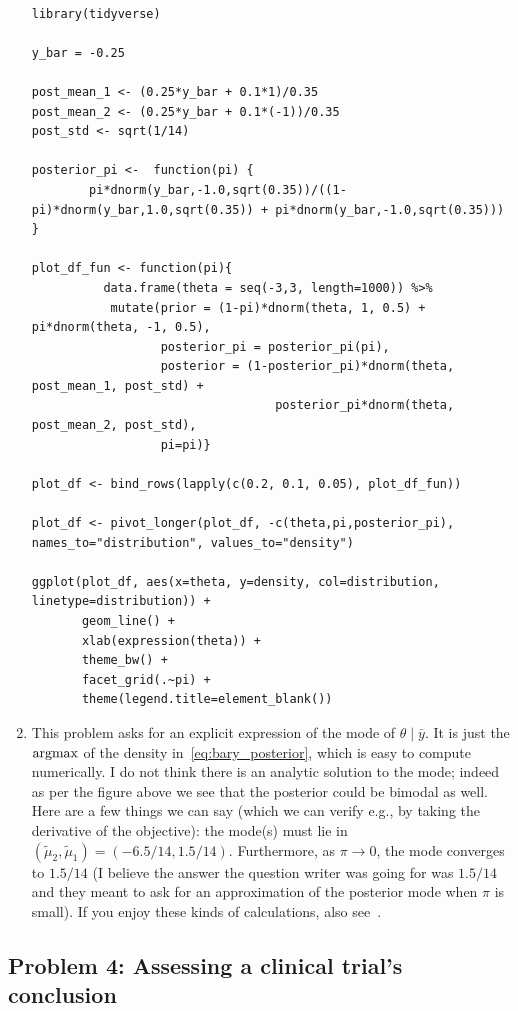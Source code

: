 \begin{enumerate}[label=(\alph*)]
\scriptsize
\begin{lstlisting}

library(tidyverse)

y_bar = -0.25

post_mean_1 <- (0.25*y_bar + 0.1*1)/0.35
post_mean_2 <- (0.25*y_bar + 0.1*(-1))/0.35
post_std <- sqrt(1/14)

posterior_pi <-  function(pi) {
        pi*dnorm(y_bar,-1.0,sqrt(0.35))/((1-pi)*dnorm(y_bar,1.0,sqrt(0.35)) + pi*dnorm(y_bar,-1.0,sqrt(0.35))) }

plot_df_fun <- function(pi){
          data.frame(theta = seq(-3,3, length=1000)) %>%
           mutate(prior = (1-pi)*dnorm(theta, 1, 0.5) + pi*dnorm(theta, -1, 0.5),
                  posterior_pi = posterior_pi(pi),
                  posterior = (1-posterior_pi)*dnorm(theta, post_mean_1, post_std) +
                                  posterior_pi*dnorm(theta, post_mean_2, post_std),
                  pi=pi)}

plot_df <- bind_rows(lapply(c(0.2, 0.1, 0.05), plot_df_fun))

plot_df <- pivot_longer(plot_df, -c(theta,pi,posterior_pi), names_to="distribution", values_to="density")

ggplot(plot_df, aes(x=theta, y=density, col=distribution, linetype=distribution)) +
       geom_line() +
       xlab(expression(theta)) +
       theme_bw() +
       facet_grid(.~pi) +
       theme(legend.title=element_blank())
\end{lstlisting}
\normalsize

\item This problem asks for an explicit expression of the mode of $\theta \mid \bar{y}$. It is just the $\operatorname*{argmax}$ of the density in~\eqref{eq:bary_posterior}, which is easy to compute numerically. I do not think there is an analytic solution to the mode; indeed as per the figure above we see that the posterior could be bimodal as well. Here are a few things we can say (which we can verify e.g., by taking the derivative of the objective): the mode(s) must lie in $(\tilde{\mu}_2, \tilde{\mu}_1) = (-6.5/14, 1.5/14)$. Furthermore, as $\pi \to 0$, the mode converges to $1.5/14$ (I believe the answer the question writer was going for was $1.5/14$ and they meant to ask for an approximation of the posterior mode when $\pi$ is small). If you enjoy these kinds of calculations, also see~\citet{behboodian1970modes}.


\end{enumerate}

\subsection*{Problem 4: Assessing a clinical trial's conclusion}

